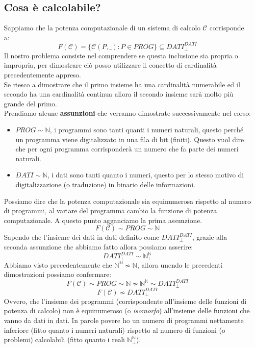 \documentclass{article}
\begin{document}
\subsection{Cosa è calcolabile?}
Sappiamo che la potenza computazionale di un sistema di calcolo $\mathcal{C}$ corrisponde a:
$$F(\mathcal{C})=\{\mathcal{C}(P,\_):P\in PROG\}\subseteq DATI_{\bot}^{DATI}$$
Il nostro problema consiste nel comprendere se questa inclusione sia propria o impropria,
per dimostrare ciò posso utilizzare il concetto di cardinalità precedentemente appreso.\\
Se riesco a dimostrare che il primo insieme ha una cardinalità numerabile ed il secondo ha
una cardinalità continua allora il secondo insieme sarà molto più grande del primo.\\Prendiamo alcune
\textbf{assunzioni} che verranno dimostrate successivamente nel corso:
\begin{itemize}
    \item $PROG\sim\mathbb{N}$, i programmi sono tanti quanti i numeri naturali, questo
          perché un programma viene digitalizzato in una fila di bit (finiti). Questo vuol dire che per ogni
          programma corrisponderà un numero che fa parte dei numeri naturali.

    \item $DATI\sim\mathbb{N}$, i dati sono tanti quanto i numeri, questo per lo stesso motivo
          di digitalizzazione (o traduzione) in binario delle informazioni.
\end{itemize}
Possiamo dire che la potenza computazionale sia equinumerosa rispetto al numero di programmi,
al variare del programma cambio la funzione di potenza computazionale. A questo punto agganciamo
la prima assunzione.
$$F(\mathcal{C})\sim PROG\sim\mathbb{N}$$
Sapendo che l'insieme dei dati in dati definito come $DATI_{\bot}^{DATI}$, grazie alla
seconda assunzione che abbiamo fatto allora possiamo asserire:
$$DATI_{\bot}^{DATI}\sim\mathbb{N}_{\bot}^{\mathbb{N}}$$
Abbiamo visto precedentemente che $\mathbb{N}^{\mathbb{N}}\nsim\mathbb{N}$, allora unendo le precedenti
dimostrazioni possiamo confermare:
$$F(\mathcal{C})\sim PROG\sim\mathbb{N}\nsim\mathbb{N}^{\mathbb{N}}\sim DATI_{\bot}^{DATI}$$
$$F(\mathcal{C})\nsim DATI_{\bot}^{DATI}$$
Ovvero, che l'insieme dei programmi (corrispondente all'insieme delle funzioni di potenza di calcolo)
non è equinumeroso (o \textit{isomorfo}) all'insieme delle funzioni che vanno da dati in dati. In parole
povere ho un numero di programmi nettamente inferiore (fitto quanto i numeri naturali) rispetto al numero
di funzioni (o problemi) calcolabili (fitto quanto i reali $\mathbb{N}_{\bot}^{\mathbb{N}}$).
\end{document}
